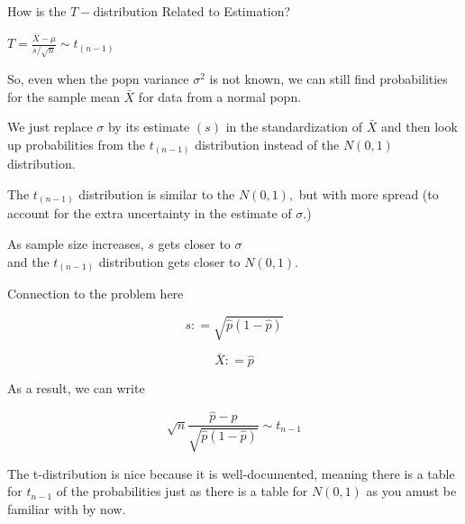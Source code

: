 \documentclass{beamer}\usepackage[]{graphicx}\usepackage[]{color}
\begin{document}
\begin{frame}{How is the $T-$distribution Related to Estimation?}


$T = \frac{\bar{X}-\mu}{s/\sqrt{n}} \sim t_{(n-1)}$ \pause

\bigskip

So, even when the popn variance $\sigma^2$ is not known, we can
still find probabilities for the sample mean $\bar{X}$ for data from a
normal popn. \pause
\medskip

We just replace $\sigma$ by its estimate $(s)$ in the standardization of
$\bar{X}$ and then look up probabilities from the $t_{(n-1)}$ distribution
instead of the $N(0,1)$ distribution. \pause
\bigskip

The $t_{(n-1)}$ distribution is similar to the $N(0,1),$ but with more
spread (to account for the extra uncertainty in the estimate of $\sigma$.)
\medskip \pause

As sample size increases, $s$ gets closer to $\sigma$ \\
and the $t_{(n-1)}$ distribution gets closer to $N(0,1).$ \pause

\end{frame}

\begin{frame}{Connection to the problem here}

$$ s : = \sqrt{\hat{p} (1 - \hat{p})}  $$

$$ \bar{X} : = \hat{p} $$ \pause

As a result, we can write

$$ \sqrt{n} \frac{\hat{p} - p}{\sqrt{\hat{p}(1-\hat{p})}} \sim t_{n-1} $$ \pause


The t-distribution is nice because it is well-documented, meaning there is a table for $t_{n-1}$ of the probabilities just as there is a table for $N(0,1)$ as you amust be familiar with by now.


\end{frame}
\end{document}
